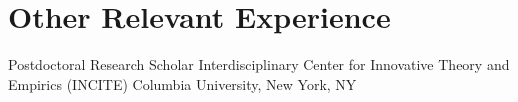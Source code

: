 
\section*{Other Relevant Experience}

  {Postdoctoral Research Scholar}
  {
      Interdisciplinary Center for Innovative Theory and Empirics (INCITE) \newline
      Columbia University, New York, NY
  }{}
